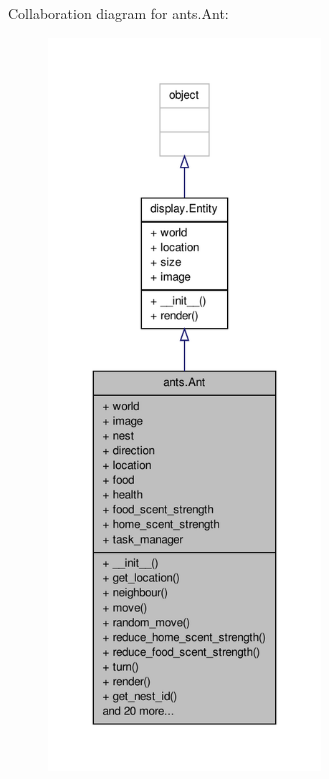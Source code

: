Collaboration diagram for ants.\+Ant\+:
\nopagebreak
\begin{figure}[H]
\begin{center}
\leavevmode
\includegraphics[height=550pt]{classants_1_1Ant__coll__graph}
\end{center}
\end{figure}
